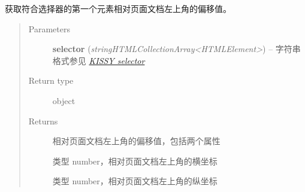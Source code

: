 \documentclass[letterpaper,10pt,english]{sphinxmanual}
\begin{document}
\begin{fulllineitems}
\label{api/core/dom/offset:DOM.offset}
获取符合选择器的第一个元素相对页面文档左上角的偏移值。
\begin{quote}\begin{description}
\item[{Parameters}] \leavevmode
\textbf{selector} (\emph{string\textbar{}HTMLCollection\textbar{}Array\textless{}HTMLElement\textgreater{}}) -- 字符串格式参见 {\hyperref[api/core/dom/selector:dom-selector]{\emph{KISSY selector}}}

\item[{Return type}] \leavevmode
object

\item[{Returns}] \leavevmode

相对页面文档左上角的偏移值，包括两个属性


\begin{fulllineitems}
\label{api/core/dom/offset:DOM.left}
类型 number，相对页面文档左上角的横坐标

\end{fulllineitems}



\begin{fulllineitems}
\label{api/core/dom/offset:DOM.top}
类型 number，相对页面文档左上角的纵坐标

\end{fulllineitems}



\end{description}\end{quote}

\end{fulllineitems}


\end{document}
